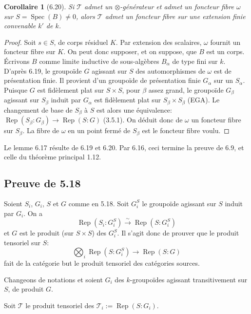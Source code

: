 \documentclass[12pt,a4paper]{article}
\theoremstyle{plain}
\newtheorem{corollary}[theorem]{Corollaire}
\theoremstyle{definition}
\DeclareMathOperator{\Spec}{Spec}
\DeclareMathOperator{\Rep}{Rep}
\begin{document}
\begin{corollary}[6.20]
Si $\mathcal{T}$ admet un $\otimes$-générateur et admet un foncteur fibre $\omega$ sur $S = \Spec(B) \neq 0$, alors $\mathcal{T}$ admet un foncteur fibre sur une extension finie convenable $k'$ de $k$.
\end{corollary}

\begin{proof}
Soit $s \in S$, de corps résiduel $K$. Par extension des scalaires, $\omega$ fournit un foncteur fibre sur $K$. On peut donc supposer, et on suppose, que $B$ est un corps. Écrivons $B$ comme limite inductive de sous-algèbres $B_\alpha$ de type fini sur $k$. D'après 6.19, le groupoïde $G$ agissant sur $S$ des automorphismes de $\omega$ est de présentation finie. Il provient d'un groupoïde de présentation finie $G_\alpha$ sur un $S_\alpha$. Puisque $G$ est fidèlement plat sur $S \times S$, pour $\beta$ assez grand, le groupoïde $G_\beta$ agissant sur $S_\beta$ induit par $G_\alpha$ est fidèlement plat sur $S_\beta \times S_\beta$ (EGA). Le changement de base de $S_\beta$ à $S$ est alors une équivalence: $\Rep(S_\beta : G_\beta) \to \Rep(S : G)$ (3.5.1). On déduit donc de $\omega$ un foncteur fibre sur $S_\beta$. La fibre de $\omega$ en un point fermé de $S_\beta$ est le foncteur fibre voulu.
\end{proof}

Le lemme 6.17 résulte de 6.19 et 6.20. Par 6.16, ceci termine la preuve de 6.9, et celle du théorème principal 1.12.

\subsection{Preuve de 5.18}

Soient $S_i$, $G_i$, $S$ et $G$ comme en 5.18. Soit $G_i^S$ le groupoïde agissant sur $S$ induit par $G_i$. On a
\[
\Rep(S_i : G_i^S) \xrightarrow{\sim} \Rep(S : G_i^S)
\]
et $G$ est le produit (sur $S \times S$) des $G_i^S$. Il s'agit donc de prouver que le produit tensoriel sur $S$:
\begin{equation}\label{eq:6.21.1}
\bigotimes_i \Rep(S : G_i^S) \to \Rep(S : G)
\end{equation}
fait de la catégorie but le produit tensoriel des catégories sources.

Changeons de notations et soient $G_i$ des $k$-groupoïdes agissant transitivement sur $S$, de produit $G$.

Soit $\mathcal{T}$ le produit tensoriel des $\mathcal{T}_i := \Rep(S : G_i)$.
\end{document}

